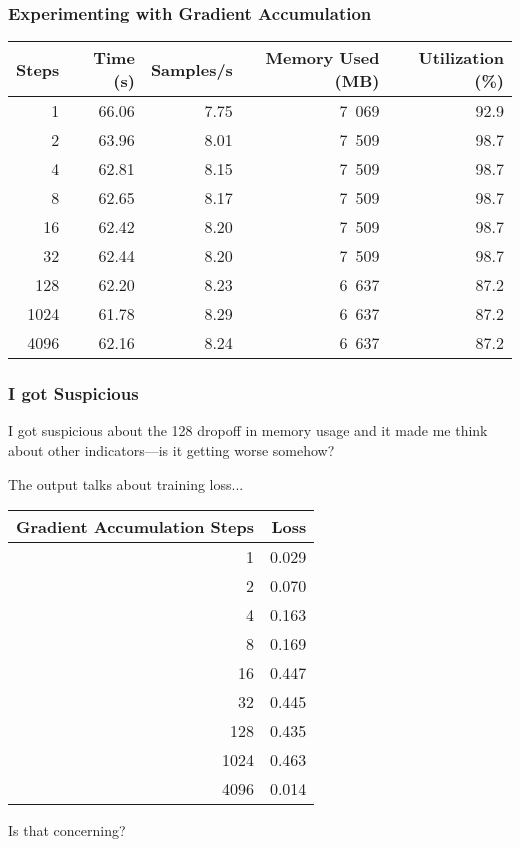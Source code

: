 \begin{frame}
\frametitle{Experimenting with Gradient Accumulation}

\begin{center}
\begin{tabular}{r|r|r|r|r}
\textbf{Steps} & \textbf{Time (s)} & \textbf{Samples/s} & \textbf{Memory Used (MB)} & \textbf{Utilization (\%)} \\ \hline
1 & 66.06 & 7.75 & 7~069 & 92.9 \\
2 & 63.96 & 8.01 & 7~509 & 98.7 \\
4 & 62.81 & 8.15 & 7~509 & 98.7 \\
8 & 62.65 & 8.17 & 7~509 & 98.7 \\
16 & 62.42 & 8.20 & 7~509 & 98.7 \\
32 & 62.44 & 8.20 & 7~509 & 98.7\\
128 & 62.20 & 8.23 & 6~637 & 87.2\\
1024 & 61.78 & 8.29 & 6~637 & 87.2 \\
4096 & 62.16 & 8.24 & 6~637 & 87.2
\end{tabular}
\end{center}

\end{frame}

\begin{frame}
\frametitle{I got Suspicious}

I got suspicious about the 128 dropoff in memory usage and it made me think about other indicators---is it getting worse somehow? 

The output talks about training loss...

\begin{center}
\begin{tabular}{r|r}
\textbf{Gradient Accumulation Steps} & \textbf{Loss} \\ \hline
1 & 0.029 \\
2 & 0.070 \\
4 & 0.163 \\
8 & 0.169 \\
16 & 0.447 \\
32 & 0.445 \\
128 & 0.435 \\
1024 & 0.463 \\
4096 & 0.014 \\
\end{tabular}
\end{center}

Is that concerning?

\end{frame}

